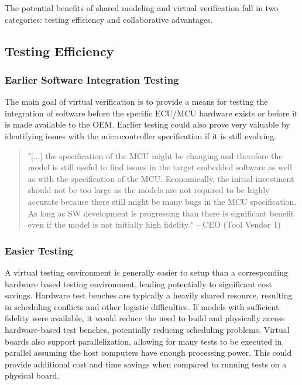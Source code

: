 The potential benefits of shared modeling and virtual verification fall in two categories:
testing efficiency and collaborative advantages.

\subsection{Testing Efficiency}
\subsubsection{Earlier Software Integration Testing}
The main goal of virtual verification is to provide a means for testing the integration of software before the specific ECU/MCU hardware exists or before it is made available to the OEM.
Earlier testing could also prove very valuable by identifying issues with the microcontroller specification if it is still evolving.
\begin{quote}
"[...] the specification of the MCU might be changing and therefore the model is still useful to find issues in the target embedded software as well as with the specification of the MCU. Economically, the initial investment should not be too large as the models are not required to be highly accurate because there still might be many bugs in the MCU specification. As long as SW development is progressing than there is significant benefit even if the model is not initially high fidelity."
-- CEO (Tool Vendor 1)
\end{quote}

\subsubsection{Easier Testing}
A virtual testing environment is generally easier to setup than a corresponding hardware based testing environment,
leading potentially to significant cost savings.
Hardware test benches are typically a heavily shared resource, resulting in scheduling conflicts and other logistic difficulties.
If models with sufficient fidelity were available, it would reduce the need to build and physically access hardware-based test benches, potentially reducing scheduling problems.
Virtual boards also support parallelization, allowing for many tests to be executed in parallel assuming the host computers have enough processing power.
This could provide additional cost and time savings when compared to running tests on a physical board.


